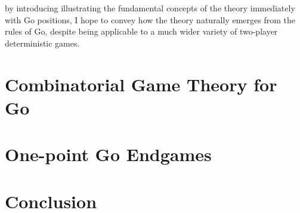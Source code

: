 \documentclass{article}
\theoremstyle{plain}
\theoremstyle{definition}
\begin{document}
by introducing illustrating the fundamental concepts of the theory immediately 
with Go positions, I hope to convey how the theory naturally emerges from the rules 
of Go, despite being applicable to a much wider variety of two-player deterministic
games. 



\section{Combinatorial Game Theory for Go}







\section{One-point Go Endgames}







\section{Conclusion}




\end{document}
